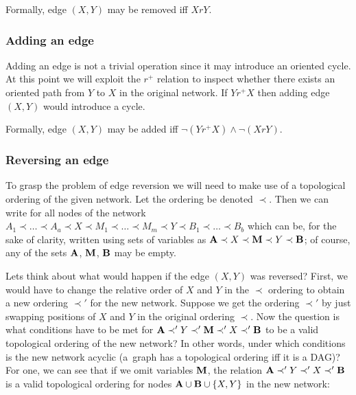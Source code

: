 \documentclass[english,cover]{fitthesis} %
\newcommand{\vars}[1]{{\bold{#1}}}         %
\begin{document}
Formally, edge $(X,Y)$ may be removed iff $XrY$.


\subsubsection{Adding an edge}
Adding an edge is not a trivial operation since it may introduce an oriented cycle. At this point we will exploit the $r^+$ relation to inspect whether there exists an oriented path from $Y$ to $X$ in the original network. If $Y r^+ X$ then adding edge $(X,Y)$ would introduce a cycle.

Formally, edge $(X,Y)$ may be added iff $\neg(Y r^+ X) \land \neg(X r Y)$.


\subsubsection{Reversing an edge}
To grasp the problem of edge reversion we will need to make use of a topological ordering of the given network. Let the ordering be denoted $\prec$. Then we can write for all nodes of the network $A_1 \prec \dots \prec A_a \prec X \prec M_1 \prec \dots \prec M_m \prec Y \prec B_1 \prec \dots \prec B_b$ which can be, for the sake of clarity, written using sets of variables as $\vars{A} \prec X \prec \vars{M} \prec Y \prec \vars{B}$; of course, any of the sets $\vars{A}$, $\vars{M}$, $\vars{B}$ may be empty.

Lets think about what would happen if the edge $(X,Y)$ was reversed? First, we would have to change the relative order of $X$ and $Y$ in the $\prec$ ordering to obtain a new ordering $\prec'$ for the new network. Suppose we get the ordering $\prec'$ by just swapping positions of $X$ and $Y$ in the original ordering $\prec$. Now the question is what conditions have to be met for $\vars{A} \prec' Y \prec' \vars{M} \prec' X \prec' \vars{B}$ to be a valid topological ordering of the new network? In other words, under which conditions is the new network acyclic (a~graph has a topological ordering iff it is a DAG)?
For one, we can see that if we omit variables $\vars{M}$, the relation $\vars{A} \prec' Y \prec' X \prec' \vars{B}$ is a valid topological ordering for nodes $\vars{A} \cup \vars{B} \cup \lbrace X,Y \rbrace$ in the new network:
\end{document}
